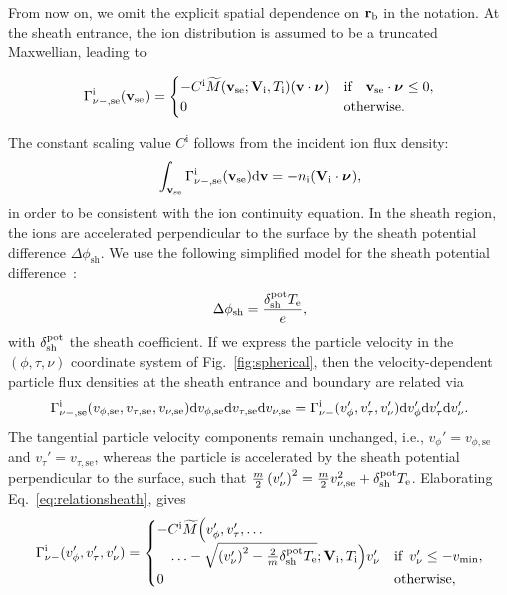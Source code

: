 From now on, we omit the explicit spatial dependence on ${\bf r}_{\mathrm{b}}$ in the notation. At the sheath entrance, the ion distribution is assumed to be a truncated Maxwellian, leading to

\begin{equation}
\Gamma_{\nu-,\mathrm{se}}^{\mathrm{i}}({\bf v}_{\mathrm{se}}) = \begin{cases} - C^{\mathrm{i}} \widetilde{M}({\bf v}_{\mathrm{se}};{\bf V}_{\mathrm{i}},T_{\mathrm{i}}) ({\bf v} \cdot {\boldsymbol \nu}_{}) & \text{if} \quad {\bf v}_{\mathrm{se}} \cdot {\boldsymbol \nu}_{} \leq 0, \\
0 & \text{otherwise}. \end{cases} \label{eq:truncMaxw}
\end{equation}

The constant scaling value $C^{\mathrm{i}}$ follows from the incident ion flux density:
\begin{equation}
\int_{{\bf v}_{\mathrm{se}}} \Gamma_{\nu-,\mathrm{se}}^{\mathrm{i}}({\bf v}_{\mathrm{se}}) \mathrm{d} {\bf v} = - n_{\mathrm{i}} ({\bf V}_{\mathrm{i}} \cdot {\boldsymbol \nu}_{}),
\end{equation}
in order to be consistent with the ion continuity equation. In the sheath region, the ions are accelerated perpendicular to the surface by the sheath potential difference $\Delta \phi_{\mathrm{sh}}$. We use the following simplified model for the sheath potential difference~\cite{stangeby1984plasma}:
\begin{equation}\label{eq:shpot}
\Delta \phi_{\mathrm{sh}} = \frac{\delta_{\mathrm{sh}}^{\mathrm{pot}} T_{\mathrm{e}}}{e},
\end{equation}
with $\delta_{\mathrm{sh}}^{\mathrm{pot}}$ the sheath coefficient. If we express the particle velocity in the $(\phi,\tau,\nu)$ coordinate system of Fig.~\ref{fig:spherical}, then the velocity-dependent particle flux densities at the sheath entrance and boundary are related via
\begin{equation}
\Gamma_{\nu-,\mathrm{se}}^{\mathrm{i}}(v_{\phi,\mathrm{se}},v_{\tau,\mathrm{se}},v_{\nu,\mathrm{se}}) \mathrm{d} v_{\phi,\mathrm{se}} \mathrm{d} v_{\tau,\mathrm{se}} \mathrm{d} v_{\nu,\mathrm{se}} = \Gamma_{\nu -}^{\mathrm{i}}(v_{\phi}',v_{\tau}',v_{\nu}') \mathrm{d} v_{\phi}' \mathrm{d} v_{\tau}' \mathrm{d} v_{\nu}'. \label{eq:relationsheath}
\end{equation}
The tangential particle velocity components remain unchanged, i.e., $v_{\phi}' = v_{\phi,\mathrm{se}}$ and $v_{\tau}' = v_{\tau,\mathrm{se}}$, whereas the particle is accelerated by the sheath potential perpendicular to the surface, such that $\frac{m}{2}\left (v_{\nu}'\right )^{2} = \frac{m}{2} v_{\nu,\mathrm{se}}^{2} + \delta_{\mathrm{sh}}^{\mathrm{pot}} T_{\mathrm{e}}$. Elaborating Eq.~\eqref{eq:relationsheath}, gives
\begin{equation}
\Gamma_{\nu -}^{\mathrm{i}}(v_{\phi}',v_{\tau}',v_{\nu}') = \begin{cases} -C^{\mathrm{i}} \widetilde{M} \Big (v_{\phi}',v_{\tau}',\ldots \\
 \quad \ldots -\sqrt{\left (v_{\nu}'\right )^{2} - \frac{2}{m} \delta_{\mathrm{sh}}^{\mathrm{pot}}T_{\mathrm{e}}}; {\bf V}_{\mathrm{i}},T_{\mathrm{i}} \Big ) v_{\nu}' &  \text{if} \enskip v_{\nu}' \leq -v_{\mathrm{min}}, \\
0 & \text{otherwise}, \end{cases}
\end{equation}
